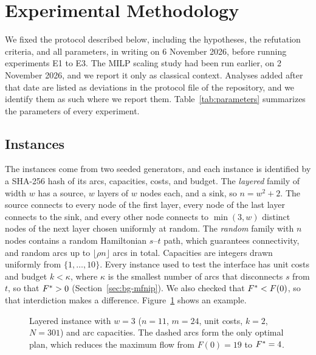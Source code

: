 \section{Experimental Methodology}\label{sec:method}

We fixed the protocol described below, including the hypotheses, the refutation criteria, and all parameters, in writing on 6 November 2026, before running experiments E1 to E3. The MILP scaling study had been run earlier, on 2 November 2026, and we report it only as classical context. Analyses added after that date are listed as deviations in the protocol file of the repository, and we identify them as such where we report them. Table~\ref{tab:parameters} summarizes the parameters of every experiment.



\subsection{Instances}\label{sec:method-instances}

The instances come from two seeded generators, and each instance is identified by a SHA-256 hash of its arcs, capacities, costs, and budget. The \emph{layered} family of width $w$ has a source, $w$ layers of $w$ nodes each, and a sink, so $n=w^2+2$. The source connects to every node of the first layer, every node of the last layer connects to the sink, and every other node connects to $\min(3,w)$ distinct nodes of the next layer chosen uniformly at random. The \emph{random} family with $n$ nodes contains a random Hamiltonian $s$--$t$ path, which guarantees connectivity, and random arcs up to $\lfloor\rho n\rfloor$ arcs in total. Capacities are integers drawn uniformly from $\{1,\dots,10\}$. Every instance used to test the interface has unit costs and budget $k<\kappa$, where $\kappa$ is the smallest number of arcs that disconnects $s$ from $t$, so that $F^{*}>0$ (Section~\ref{sec:bg-mfnip}). We also checked that $F^{*}<F(0)$, so that interdiction makes a difference. Figure~\ref{fig:example} shows an example.

\begin{figure}[t]
\centering

\caption{Layered instance with $w=3$ ($n=11$, $m=24$, unit costs, $k=2$, $N=301$) and arc capacities. The dashed arcs form the only optimal plan, which reduces the maximum flow from $F(0)=19$ to $F^{*}=4$.}\label{fig:example}
\end{figure}

